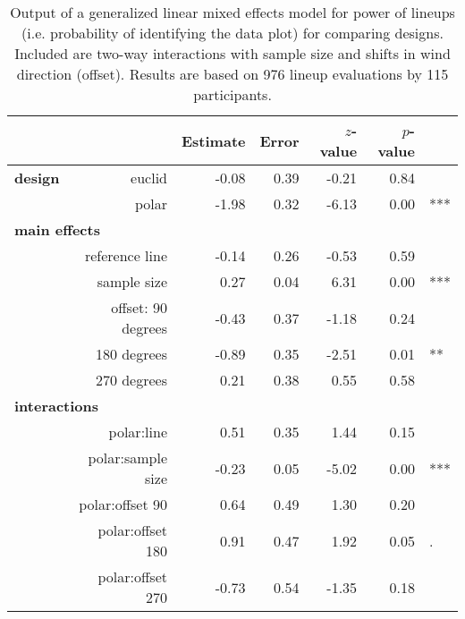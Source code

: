 \begin{table}[ht]
\begin{center}
\resizebox{\linewidth}{!} {
\begin{tabular}{rrrrrrl}
  \hline
& & Estimate & Error & $z$-value & $p$-value &\\ 
  \hline
\bf design & euclid & -0.08 & 0.39 & -0.21 & 0.84 &\\ 
&polar & -1.98 & 0.32 & -6.13 & 0.00 & ***\\ [3pt]
\multicolumn{2}{l}{\bf main effects} &&&&&\\
& reference line  & -0.14 & 0.26 & -0.53 & 0.59 & \\ [1pt]
&  sample size & 0.27 & 0.04 & 6.31 & 0.00 & ***\\[1pt]
 &offset:  90 degrees& -0.43 & 0.37 & -1.18 & 0.24 &\\ 
  & 180 degrees& -0.89 & 0.35 & -2.51 & 0.01 & **\\ 
  & 270 degrees& 0.21 & 0.38 & 0.55 & 0.58 &\\ [3pt]
\multicolumn{2}{l}{\bf interactions} &&&&&\\
&  polar:line & 0.51 & 0.35 & 1.44 & 0.15 &\\ [1pt]
&    polar:sample size & -0.23 & 0.05 & -5.02 & 0.00 & ***\\[1pt]
&    polar:offset 90 & 0.64 & 0.49 & 1.30 & 0.20 \\ 
&  polar:offset 180 & 0.91 & 0.47 & 1.92 & 0.05 & .\\ 
&    polar:offset 270 & -0.73 & 0.54 & -1.35 & 0.18 &\\
   \hline
\end{tabular}
}
\end{center}
\caption{\label{tbl:correct} Output of a generalized linear mixed effects model for power of lineups (i.e. probability of identifying the data plot) for comparing designs. Included are two-way interactions with sample size and shifts in wind direction (offset). Results are based on  976 lineup evaluations by 115 participants. }
\end{table}


